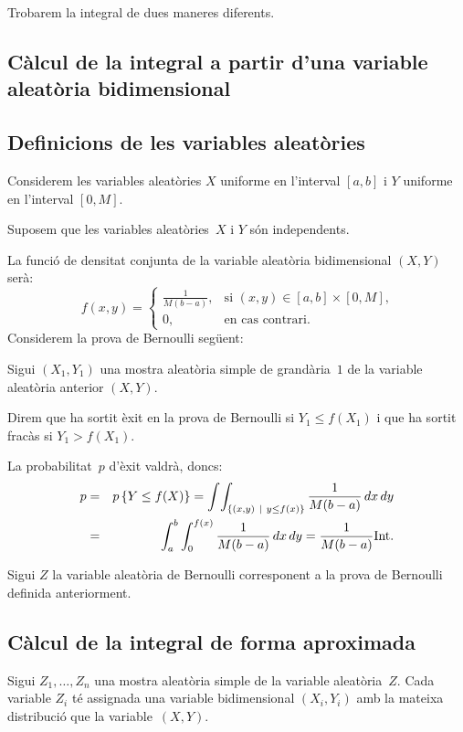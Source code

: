 Trobarem la integral de dues maneres diferents.

\subsection{C\`alcul de la integral a partir d'una variable aleat\`oria 
bidimensional}

\subsection*{Definicions de les variables aleat\`ories}
Considerem les variables aleat\`ories $X$ 
uniforme en l'interval $[a,b]$ i $Y$ uniforme en l'interval $[0,M]$.

Suposem que les variables aleat\`ories~$X$ i $Y$ s\'on 
independents.

La funci\'o de densitat conjunta 
de la variable aleat\`oria bidimensional
$(X,Y)$ ser\`a:
\[
f(x,y)=
\left\{
\begin{array}{ll}
\frac{1}{M(b-a)}, & \mbox{si $(x,y)\in [a,b]\times [0,M]$,} \\
0, & \mbox{en cas contrari.}
\end{array}
\right.
\]
Considerem la prova de Bernoulli seg\"uent:

Sigui $(X_1,Y_1)$ una mostra aleat\`oria
 simple de grand\`aria~$1$ de la 
variable aleat\`oria anterior $(X,Y)$.

Direm que ha sortit \`exit en la prova de Bernoulli si 
\mbox{$Y_1\leq f(X_1)$} i 
que ha sortit frac\`as si \mbox{$Y_1 > f(X_1)$.}

La probabilitat~$p$ d'\`exit valdr\`a, doncs:
\begin{eqnarray*}
p & = & p\left\{Y\leq f(X)\right\} = \int\!\int_{\{(x,y)\ |\ y\leq f(x)\}} 
\frac{1}{M(b-a)}\, dx\,dy \\ & = & \int_a^b
\int_0^{f(x)}\frac{1}{M(b-a)}\, dx\, dy =\frac{1}{M(b-a)} {\rm Int}.
\end{eqnarray*}

Sigui $Z$ la variable aleat\`oria de Bernoulli 
corresponent a la prova de Bernoulli definida anteriorment.

\subsection*{C\`alcul de la integral de forma aproximada}

Sigui $Z_1,\ldots,Z_n$ una mostra aleat\`oria simple de la variable
aleat\`oria~$Z$. Cada va\-ria\-ble $Z_i$ t\'e assignada una variable 
bidimensional $(X_i,Y_i)$ amb la mateixa 
distribuci\'o que la variable~$(X,Y)$.

